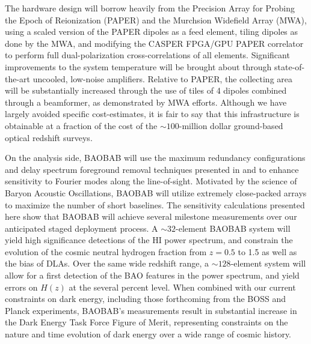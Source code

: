 \documentclass[10pt,iop]{emulateapj}
\begin{document}
The hardware design will borrow heavily from the Precision Array for Probing the Epoch
of Reionization (PAPER) and the Murchsion Widefield Array (MWA), 
using a scaled version of the PAPER dipoles as a feed element, tiling dipoles as done by the MWA,
and modifying the CASPER FPGA/GPU PAPER correlator to perform full
dual-polarization cross-correlations of all elements.  Significant improvements to the
system temperature will be brought about through state-of-the-art uncooled, 
low-noise amplifiers.  Relative to PAPER, the collecting area will be substantially
increased through the use of tiles of 4 dipoles combined through a beamformer, as demonstrated
by MWA efforts.  Although we have largely avoided specific cost-estimates, it is fair to say that
this infrastructure is obtainable at a fraction of the cost of the $\sim100$-million dollar 
ground-based optical redshift surveys.

On the analysis side, BAOBAB will use the maximum redundancy
configurations and delay spectrum foreground removal techniques presented in 
\citet{parsons_et_al_2012a} and \citet{parsons_et_al_2012b} to enhance sensitivity to
Fourier modes along the line-of-sight.  Motivated by the science of Baryon Acoustic Oscillations,
BAOBAB will utilize extremely close-packed arrays to maximize the number of short baselines.
The sensitivity calculations presented here
show that BAOBAB will achieve several milestone measurements over our anticipated staged deployment
process.  A $\sim32$-element BAOBAB system will yield high significance detections of the HI power
spectrum, and constrain the evolution of the cosmic neutral hydrogen fraction from $z = 0.5$ to
1.5 as well as the bias of DLAs.  Over the same wide redshift range, a $\sim128$-element system will allow for a first detection of the BAO features in the
power spectrum, and yield errors on $H(z)$ at the several percent level.  When combined
with our current constraints on dark energy, including those forthcoming from the BOSS and Planck 
experiments,
BAOBAB's measurements result in substantial increase in the Dark Energy Task Force Figure of Merit,
representing constraints on the nature and time evolution of dark energy over a wide range of cosmic history.
\end{document}
